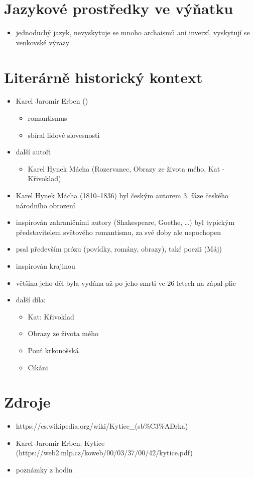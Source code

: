 \documentclass[10pt,a4paper]{article}
\begin{document}
\section*{Jazykové prostředky ve výňatku}

	\begin{itemize}
	\item jednoduchý jazyk, nevyskytuje se mnoho archaismů ani inverzí, vyskytují se venkovské výrazy
	\end{itemize}

\section*{Literárně historický kontext}
\begin{itemize}
\item Karel Jaromír Erben ()
	\begin{itemize}
	\item romantismus
	\item sbíral lidové slovesnosti
	\end{itemize}
	
\item další autoři
	\begin{itemize}
	\item Karel Hynek Mácha (Rozervanec, Obrazy ze života mého, Kat - Křivoklad)
	\end{itemize}




\item Karel Hynek Mácha (1810--1836) byl českým autorem 3. fáze českého národního obrození
\item  inspirován zahraničními autory (Shakespeare, Goethe, \ldots) byl typickým představitelem světového romantismu, za své doby ale nepochopen
\item psal především prózu (povídky, romány, obrazy), také poezii (Máj) 
\item inspirován krajinou
\item většina jeho děl byla vydána až po jeho smrti ve 26 letech na zápal plic
\item další díla:
	\begin{itemize}
	\item Kat: Křivoklad
	\item Obrazy ze života mého
	\item Pouť krkonošská
	\item Cikáni
	\end{itemize}
\end{itemize}
\section*{Zdroje}
\begin{itemize}

\item https://cs.wikipedia.org/wiki/Kytice\_(sb\%C3\%ADrka) \\
\item Karel Jaromír Erben: Kytice (https://web2.mlp.cz/koweb/00/03/37/00/42/kytice.pdf)
\item poznámky z hodin
\end{itemize}
\end{document}
